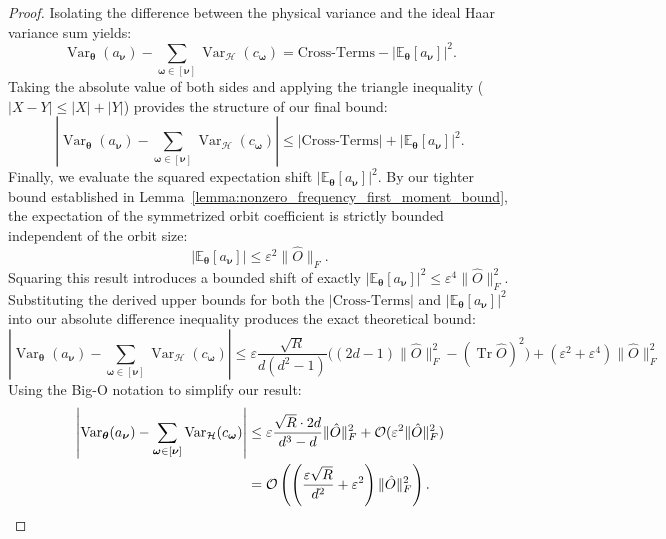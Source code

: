 \documentclass[%
 reprint,
 amsmath,amssymb,
 aps,
 pra,
]{revtex4-2}
\theoremstyle{definition}
\begin{document}
\begin{proof}
Isolating the difference between the physical variance and the ideal Haar variance sum yields:
\begin{equation}
\operatorname{Var}_{\bm{\theta}}(a_{\bm{\nu}}) - \sum_{\bm{\omega}\in[\bm{\nu}]} \operatorname{Var}_{\mathcal{H}}(c_{\bm{\omega}}) = \text{Cross-Terms} - |\mathbb{E}_{\bm{\theta}}[a_{\bm{\nu}}]|^2.
\end{equation}
Taking the absolute value of both sides and applying the triangle inequality ($|X - Y| \leq |X| + |Y|$) provides the structure of our final bound:
\begin{equation}
\left| \operatorname{Var}_{\bm{\theta}}(a_{\bm{\nu}}) - \sum_{\bm{\omega}\in[\bm{\nu}]} \operatorname{Var}_{\mathcal{H}}(c_{\bm{\omega}}) \right| \leq |\text{Cross-Terms}| + |\mathbb{E}_{\bm{\theta}}[a_{\bm{\nu}}]|^2.
\end{equation}
Finally, we evaluate the squared expectation shift $|\mathbb{E}_{\bm{\theta}}[a_{\bm{\nu}}]|^2$. By our tighter bound established in Lemma~\ref{lemma:nonzero_frequency_first_moment_bound}, the expectation of the symmetrized orbit coefficient is strictly bounded independent of the orbit size:
\begin{equation}
|\mathbb{E}_{\bm{\theta}}[a_{\bm{\nu}}]| \leq \varepsilon^2 \|\hat{O}\|_F.
\end{equation}
Squaring this result introduces a bounded shift of exactly $|\mathbb{E}_{\bm{\theta}}[a_{\bm{\nu}}]|^2 \leq \varepsilon^4 \|\hat{O}\|_F^2$. Substituting the derived upper bounds for both the $|\text{Cross-Terms}|$ and $|\mathbb{E}_{\bm{\theta}}[a_{\bm{\nu}}]|^2$ into our absolute difference inequality produces the exact theoretical bound:
\begin{equation}
\label{eq:exact_coeff_bound}
\left| \operatorname{Var}_{\bm{\theta}}(a_{\bm{\nu}}) - \sum_{\bm{\omega}\in[\bm{\nu}]} \operatorname{Var}_{\mathcal{H}}(c_{\bm{\omega}}) \right|
\leq \varepsilon \frac{\sqrt{R}}{d(d^2-1)} \Big( (2d-1)\|\hat{O}\|_F^2 - (\operatorname{Tr} \hat{O})^2 \Big) + (\varepsilon^2+ \varepsilon^4) \|\hat{O}\|_F^2
\end{equation}
Using the Big-O notation to simplify our result:
\begin{align}
\left| \operatorname{Var}_{\bm{\theta}}(a_{\bm{\nu}}) - \sum_{\bm{\omega}\in[\bm{\nu}]} \operatorname{Var}_{\mathcal{H}}(c_{\bm{\omega}}) \right|
&\leq \varepsilon \frac{\sqrt{R} \cdot 2d}{d^3-d} \|\hat{O}\|_F^2 + \mathcal{O}(\varepsilon^2 \|\hat{O}\|_F^2) \notag \\
&= \mathcal{O}\left( \left( \frac{\varepsilon \sqrt{R}}{d^2} + \varepsilon^2 \right) \|\hat{O}\|_F^2 \right).

\end{align}
\end{proof}
\end{document}
